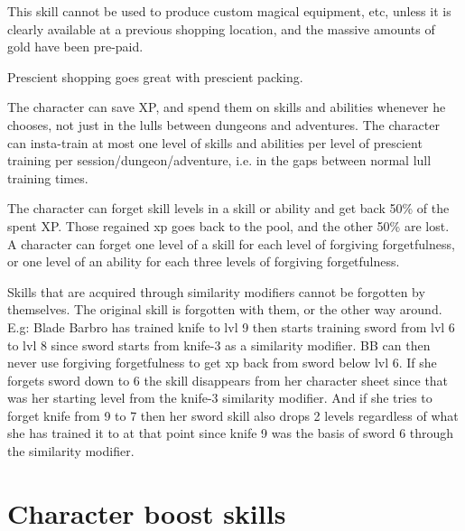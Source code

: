 This skill cannot be used to produce custom magical equipment, etc, unless it is clearly available at a previous shopping location, and the massive amounts of gold have been pre-paid.

Prescient shopping goes great with prescient packing.


 The character can save XP, and spend them on skills and abilities whenever he chooses, not just in the lulls between dungeons and adventures. The character can insta-train at most one level of skills and abilities per level of prescient training per session/dungeon/adventure, i.e. in the gaps between normal lull training times.


 The character can forget skill levels in a skill or ability and get back 50\% of the spent XP. Those regained xp goes back to the pool, and the other 50\% are lost.
A character can forget one level of a skill for each level of forgiving forgetfulness, or one level of an ability for each three levels of forgiving forgetfulness.

Skills that are acquired through similarity modifiers cannot be forgotten by themselves. The original skill is forgotten with them, or the other way around.
E.g: Blade Barbro has trained knife to lvl 9 then starts training sword from lvl 6 to lvl 8 since sword starts from knife-3 as a similarity modifier. BB can then never use forgiving forgetfulness to get xp back from sword below lvl 6. If she forgets sword down to 6 the skill disappears from her character sheet since that was her starting level from the knife-3 similarity modifier.
And if she tries to forget knife from 9 to 7 then her sword skill also drops 2 levels regardless of what she has trained it to at that point since knife 9 was the basis of sword 6 through the similarity modifier.



\closeskillslist

















\section*{Character boost skills}


